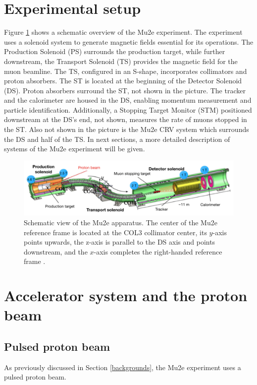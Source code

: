 \section{Experimental setup}\label{setup}
Figure \ref{fig:mu2escheme} shows a schematic overview 
of the Mu2e experiment. The experiment uses 
a solenoid system to generate magnetic fields essential 
for its operations. The Production Solenoid (PS) surrounds 
the production target, while further downstream, the 
Transport Solenoid (TS) provides the magnetic field for 
the muon beamline. The TS, configured in an S-shape, 
incorporates collimators and proton absorbers. The ST is 
located at the beginning of the Detector Solenoid (DS). 
Proton absorbers surround the ST, not shown in the picture. 
The tracker and the calorimeter are housed in the DS, 
enabling momentum measurement and particle identification. 
Additionally, a Stopping Target Monitor (STM) positioned 
downstream at the DS's end, not shown, measures the rate of muons stopped in the ST.
Also not shown 
in the picture is the Mu2e CRV system which 
surrounds the DS and half of the TS. In next sections, a 
more detailed description of systems of the Mu2e experiment will be given.
\begin{figure}[!h]
\centering
\includegraphics[width =\textwidth]{figures/png/Screenshot_20240301_143105.png}
\caption[The Mu2e apparatus.]{Schematic view of the Mu2e apparatus. The center 
of the Mu2e reference frame is located at the COL3 collimator center, its $y$-axis 
points upwards, the z-axis is parallel to the DS axis and points downstream, and 
the $x$-axis completes the right-handed reference frame \cite{universe9010054}.}
\label{fig:mu2escheme}
\end{figure}
\section{Accelerator system and the proton beam}\label{accel}
\subsection{Pulsed proton beam}\label{pulsedprotonbeam}
As previously discussed in Section  \ref{backgrounds}, the Mu2e experiment uses a 
pulsed proton beam.

